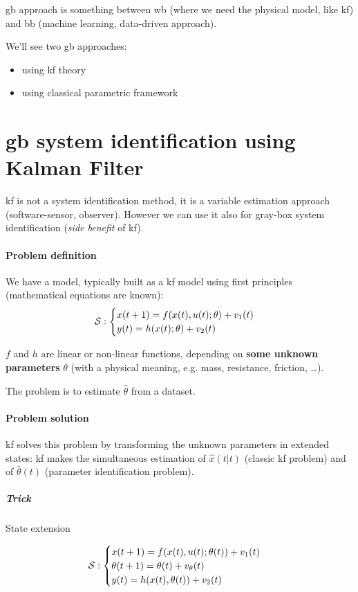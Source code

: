 
\acrfull{gb} approach is something between \acrlong{wb} (where we need the physical model, like \gls{kf}) and \acrlong{bb} (machine learning, data-driven approach).

We'll see two \gls{gb} approaches:
\begin{itemize}
    \item using \gls{kf} theory
    \item using classical parametric framework
\end{itemize}

\section{\gls{gb} system identification using Kalman Filter}
\acrlong{kf} is not a system identification method, it is a variable estimation approach (software-sensor, observer).
However we can use it also for gray-box system identification (\emph{side benefit} of \gls{kf}).

\paragraph{Problem definition} We have a model, typically built as a \gls{kf} model using first principles (mathematical equations are known):
\[
    \mathcal{S}: \begin{cases}
        x(t+1) = f(x(t), u(t); \theta) + v_1(t) \\
        y(t) = h(x(t); \theta) + v_2(t)
    \end{cases}
\]

$f$ and $h$ are linear or non-linear functions, depending on \textbf{some unknown parameters} $\theta$ (with a physical meaning, e.g. mass, resistance, friction, \dots).

The problem is to estimate $\hat{\theta}$ from a dataset.

\paragraph{Problem solution}

\gls{kf} solves this problem by transforming the unknown parameters in extended states: \gls{kf} makes the simultaneous estimation of $\hat{x}(t|t)$ (classic \gls{kf} problem) and of $\hat{\theta}(t)$ (parameter identification problem).

\subparagraph{Trick} State extension

\[
    \mathcal{S}: \begin{cases}
        x(t+1) = f(x(t), u(t); \theta(t)) + v_1(t) \\
        \theta(t+1) = \theta(t) + v_\theta(t) \\
        y(t) = h(x(t), \theta(t)) + v_2(t)
    \end{cases}
\]

